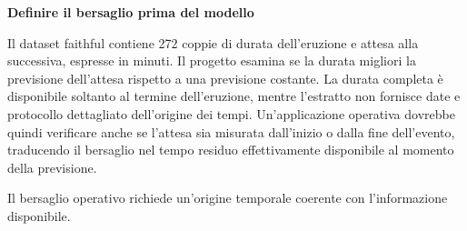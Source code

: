 \documentclass[12pt,aspectratio=1610]{beamer}
\begin{document}
\begin{frame}[plain]
\end{frame}
\begin{lrbox}{\TitleBox}\begin{minipage}[t]{18.2cm}\raggedright\sloppy\color{Ink}\fontsize{20.7}{24}\selectfont \bfseries\color{Navy}Definire il bersaglio prima del modello\end{minipage}\end{lrbox}
\begin{lrbox}{\BodyBox}\begin{minipage}[t]{10.25cm}\raggedright\sloppy\color{Ink}\fontsize{12.4}{16.4}\selectfont Il dataset faithful contiene 272 coppie di durata dell’eruzione e attesa alla successiva, espresse in minuti. Il progetto esamina se la durata migliori la previsione dell’attesa rispetto a una previsione costante. La durata completa è disponibile soltanto al termine dell’eruzione, mentre l’estratto non fornisce date e protocollo dettagliato dell’origine dei tempi. Un’applicazione operativa dovrebbe quindi verificare anche se l’attesa sia misurata dall’inizio o dalla fine dell’evento, traducendo il bersaglio nel tempo residuo effettivamente disponibile al momento della previsione.\end{minipage}\end{lrbox}
\begin{lrbox}{\SideBox}\begin{minipage}[t]{7.45cm}\raggedright\sloppy\color{Ink}\fontsize{12.2}{16.1}\selectfont \end{minipage}\end{lrbox}
\begin{lrbox}{\RecallBox}\begin{minipage}[t]{16.45cm}\raggedright\sloppy\color{Ink}\fontsize{10.1}{13.2}\selectfont Il bersaglio operativo richiede un’origine temporale coerente con l’informazione disponibile.\end{minipage}\end{lrbox}
\end{document}
